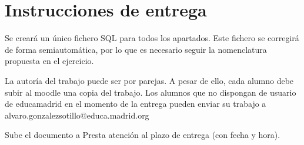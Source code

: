 \section{Instrucciones de entrega}
Se creará un único fichero SQL para todos los apartados. Este fichero se corregirá de forma semiautomática, por lo que es necesario seguir la nomenclatura propuesta en el ejercicio.

La autoría del trabajo puede ser por parejas. A pesar de ello, cada alumno debe subir al moodle una copia del trabajo. Los alumnos que no dispongan de usuario de educamadrid en el momento de la entrega pueden enviar su trabajo a alvaro.gonzalezsotillo@educa.madrid.org


Sube el documento a 
Presta atención al plazo de entrega (con fecha y hora).
  






